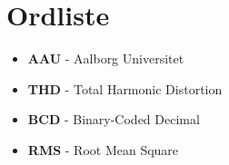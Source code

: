 \section*{Ordliste}
\begin{itemize}
\item \textbf{AAU} - Aalborg Universitet
\item \textbf{THD} - Total Harmonic Distortion
\item \textbf{BCD} - Binary-Coded Decimal
\item \textbf{RMS} - Root Mean Square
\end{itemize}

\newpage
